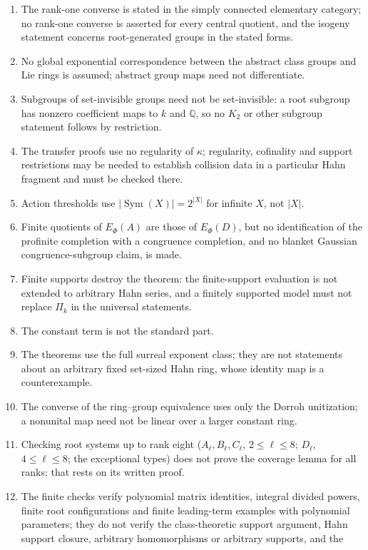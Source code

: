 \documentclass[11pt,oneside]{article}
\numberwithin{equation}{section}
\theoremstyle{definition}
\theoremstyle{remark}
\newcommand{\Q}{\mathbb Q}
\newcommand{\Sym}{\operatorname{Sym}}
\begin{document}
\begin{enumerate}[leftmargin=*,widest=00,label=12.\arabic*]
most three commutators is per root element.
\item The rank-one converse is stated in the simply connected elementary
category; no rank-one converse is asserted for every central quotient, and the
isogeny statement concerns root-generated groups in the stated forms.
\item No global exponential correspondence between the abstract class groups
and Lie rings is assumed; abstract group maps need not differentiate.
\item Subgroups of set-invisible groups need not be set-invisible: a root
subgroup has nonzero coefficient maps to $k$ and $\Q$, so no $K_2$ or other
subgroup statement follows by restriction.
\item The transfer proofs use no regularity of $\kappa$; regularity, cofinality
and support restrictions may be needed to establish collision data in a
particular Hahn fragment and must be checked there.
\item Action thresholds use $|\Sym(X)|=2^{|X|}$ for infinite $X$, not $|X|$.
\item Finite quotients of $E_\Phi(A)$ are those of $E_\Phi(D)$, but no
identification of the profinite completion with a congruence completion, and no
blanket Gaussian congruence-subgroup claim, is made.
\item Finite supports destroy the theorem: the finite-support evaluation is not
extended to arbitrary Hahn series, and a finitely supported model must not
replace $\Pi_k$ in the universal statements.
\item The constant term is not the standard part.
\item The theorems use the full surreal exponent class; they are not statements
about an arbitrary fixed set-sized Hahn ring, whose identity map is a
counterexample.
\item The converse of the ring--group equivalence uses only the Dorroh
unitization; a nonunital map need not be linear over a larger constant ring.
\item Checking root systems up to rank eight ($A_\ell,B_\ell,C_\ell$,
$2\le\ell\le8$; $D_\ell$, $4\le\ell\le8$; the exceptional types) does not prove
the coverage lemma for all ranks; that rests on its written proof.
\item The finite checks verify polynomial matrix identities, integral divided
powers, finite root configurations and finite leading-term examples with
polynomial parameters; they do not verify the class-theoretic support argument,
Hahn support closure, arbitrary homomorphisms or arbitrary supports, and the

\end{enumerate}
\end{document}
